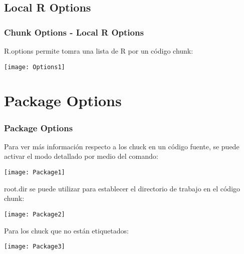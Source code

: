 \documentclass[11pt]{beamer}					%
\begin{document}
	\subsection{Local R Options}
		\begin{frame}
			\frametitle{Chunk Options - Local R Options}
				\begin{block}{R.options permite tomra una lista de R por un código chunk:}
					\begin{small}
						\begin{center}
						\texttt{[image: Options1]} 
						\end{center}
					\end{small}
				\end{block}
		\end{frame}
		
\section{Package Options}

		\begin{frame}
			\frametitle{Package Options}
				\begin{block}{Para ver más información respecto a los chuck en un código fuente, se puede activar el modo detallado por medio del comando:}
						\begin{center}
						\texttt{[image: Package1]} 
						\end{center}
				\end{block}
				\begin{block}{root.dir se puede utilizar para establecer el directorio de trabajo en el código chunk:}
					\begin{small}
						\begin{center}
						\texttt{[image: Package2]} 
						\end{center}
					\end{small}
				\end{block}
				\begin{block}{Para los chuck que no están etiquetados:}
					\begin{small}
						\begin{center}
						\texttt{[image: Package3]} 
						\end{center}
					\end{small}
				\end{block}
		\end{frame}
\end{document}
